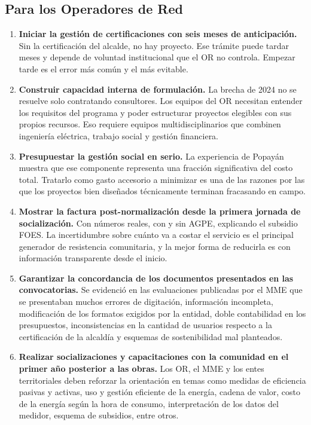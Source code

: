 \subsection{Para los Operadores de Red}
\label{subsec:rec_or}

\begin{enumerate}[label=\textbf{\arabic*.}, leftmargin=1.8cm, itemsep=8pt]

    \item \textbf{Iniciar la gestión de certificaciones con seis meses
    de anticipación.} Sin la certificación del alcalde, no hay proyecto.
    Ese trámite puede tardar meses y depende de voluntad institucional
    que el OR no controla. Empezar tarde es el error más común y el
    más evitable.

    \item \textbf{Construir capacidad interna de formulación.} La brecha
    de 2024 no se resuelve solo contratando consultores. Los equipos del
    OR necesitan entender los requisitos del programa y poder estructurar
    proyectos elegibles con sus propios recursos. Eso requiere equipos
    multidisciplinarios que combinen ingeniería eléctrica, trabajo social
    y gestión financiera.

    \item \textbf{Presupuestar la gestión social en serio.} La experiencia
    de Popayán muestra que ese componente representa una fracción
    significativa del costo total. Tratarlo como gasto accesorio a
    minimizar es una de las razones por las que los proyectos bien
    diseñados técnicamente terminan fracasando en campo.

    \item \textbf{Mostrar la factura post-normalización desde la primera
    jornada de socialización.} Con números reales, con y sin AGPE,
    explicando el subsidio FOES. La incertidumbre sobre cuánto va a
    costar el servicio es el principal generador de resistencia
    comunitaria, y la mejor forma de reducirla es con información
    transparente desde el inicio.

    \item \textbf{Garantizar la concordancia de los documentos
    presentados en las convocatorias.} Se evidenció en las evaluaciones
    publicadas por el MME que se presentaban muchos errores de
    digitación, información incompleta, modificación de los formatos
    exigidos por la entidad, doble contabilidad en los presupuestos,
    inconsistencias en la cantidad de usuarios respecto a la
    certificación de la alcaldía y esquemas de sostenibilidad mal
    planteados.

    \item \textbf{Realizar socializaciones y capacitaciones con la
    comunidad en el primer año posterior a las obras.} Los OR, el MME
    y los entes territoriales deben reforzar la orientación en temas
    como medidas de eficiencia pasivas y activas, uso y gestión eficiente
    de la energía, cadena de valor, costo de la energía según la hora de
    consumo, interpretación de los datos del medidor, esquema de
    subsidios, entre otros.
\end{enumerate}

